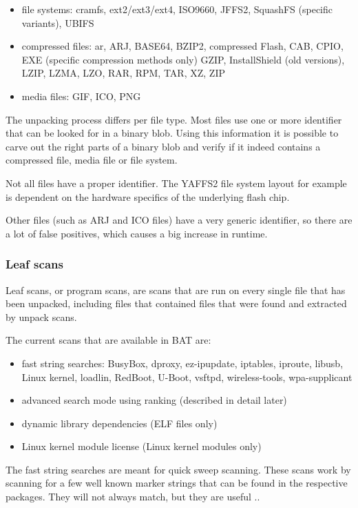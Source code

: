 \documentclass[10pt]{article}
\begin{document}
\begin{itemize}
\item file systems: cramfs, ext2/ext3/ext4, ISO9660, JFFS2, SquashFS (specific
variants), UBIFS
\item compressed files: ar, ARJ, BASE64, BZIP2, compressed Flash, CAB, CPIO,
EXE (specific compression methods only) GZIP, InstallShield (old versions),
LZIP, LZMA, LZO, RAR, RPM, TAR, XZ, ZIP
\item media files: GIF, ICO, PNG
\end{itemize}

The unpacking process differs per file type. Most files use one or more
identifier that can be looked for in a binary blob. Using this information it
is possible to carve out the right parts of a binary blob and verify if it
indeed contains a compressed file, media file or file system.

Not all files have a proper identifier. The YAFFS2 file system layout for
example is dependent on the hardware specifics of the underlying flash chip.

Other files (such as ARJ and ICO files) have a very generic identifier, so
there are a lot of false positives, which causes a big increase in runtime.

\subsubsection{Leaf scans}

Leaf scans, or program scans, are scans that are run on every single file
that has been unpacked, including files that contained files that were found
and extracted by unpack scans.

The current scans that are available in BAT are:

\begin{itemize}
\item fast string searches: BusyBox, dproxy, ez-ipupdate, iptables, iproute,
libusb, Linux kernel, loadlin, RedBoot, U-Boot, vsftpd, wireless-tools,
wpa-supplicant
\item advanced search mode using ranking (described in detail later)
\item dynamic library dependencies (ELF files only)
\item Linux kernel module license (Linux kernel modules only)
\end{itemize}

The fast string searches are meant for quick sweep scanning. These scans work
by scanning for a few well known marker strings that can be found in the
respective packages. They will not always match, but they are useful ..
\end{document}

